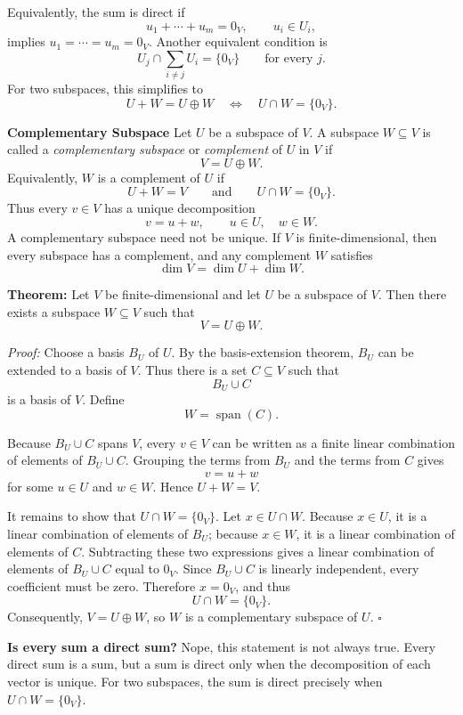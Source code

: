 \documentclass[a4paper,11pt,abstract=true]{scrartcl}
\theoremstyle{dotlessP}
\theoremstyle{dotlessS}
\theoremstyle{remark}
\theoremstyle{definition}
\begin{document}
Equivalently, the sum is direct if
\[
u_1+\cdots+u_m=0_V,
\qquad u_i\in U_i,
\]
implies $u_1=\cdots=u_m=0_V$. Another equivalent condition is
\[
U_j\cap\sum_{i\neq j}U_i=\{0_V\}
\qquad\text{for every }j.
\]
For two subspaces, this simplifies to
\[
U+W=U\oplus W
\quad\Longleftrightarrow\quad
U\cap W=\{0_V\}.
\]

\textbf{Complementary Subspace} Let $U$ be a subspace of $V$.
A subspace $W\subseteq V$ is called a \emph{complementary subspace} or
\emph{complement} of $U$ in $V$ if
\[
V=U\oplus W.
\]
Equivalently, $W$ is a complement of $U$ if
\[
U+W=V
\qquad\text{and}\qquad
U\cap W=\{0_V\}.
\]
Thus every $v\in V$ has a unique decomposition
\[
v=u+w,
\qquad u\in U,\quad w\in W.
\]
A complementary subspace need not be unique. If $V$ is finite-dimensional,
then every subspace has a complement, and any complement $W$ satisfies
\[
\dim V=\dim U+\dim W.
\]

\begin{problem_box}
\textbf{Theorem:} Let $V$ be
finite-dimensional and let $U$ be a subspace of $V$. Then there exists a
subspace $W\subseteq V$ such that
\[
V=U\oplus W.
\]

\end{problem_box}

\begin{claim_box}
\textit{Proof:} Choose a basis $B_U$ of $U$. By the basis-extension theorem,
$B_U$ can be extended to a basis of $V$. Thus there is a set $C\subseteq V$
such that
\[
B_U\cup C
\]
is a basis of $V$. Define
\[
W=\operatorname{span}(C).
\]

Because $B_U\cup C$ spans $V$, every $v\in V$ can be written as a finite
linear combination of elements of $B_U\cup C$. Grouping the terms from
$B_U$ and the terms from $C$ gives
\[
v=u+w
\]
for some $u\in U$ and $w\in W$. Hence $U+W=V$.

It remains to show that $U\cap W=\{0_V\}$. Let $x\in U\cap W$. Because
$x\in U$, it is a linear combination of elements of $B_U$; because
$x\in W$, it is a linear combination of elements of $C$. Subtracting these
two expressions gives a linear combination of elements of $B_U\cup C$ equal
to $0_V$. Since $B_U\cup C$ is linearly independent, every coefficient must
be zero. Therefore $x=0_V$, and thus
\[
U\cap W=\{0_V\}.
\]
Consequently, $V=U\oplus W$, so $W$ is a complementary subspace of $U$.
\hfill$\square$
\end{claim_box}

\begin{remark_box}
\textbf{Is every sum a direct sum?} Nope, this statement is not always true. Every direct sum is a sum, but a sum
is direct only when the decomposition of each vector is unique. For two
subspaces, the sum is direct precisely when $U\cap W=\{0_V\}$.
\end{remark_box}
\end{document}
